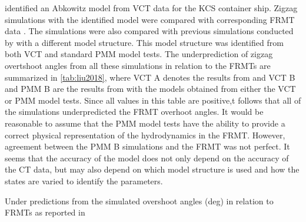 \textcite{liuPredictionsShipManeuverability2018} identified an Abkowitz model from VCT data for the KCS container ship. Zigzag simulations with the identified model were compared with corresponding FRMT data \cite{simmanWorkshopVerificationValidation2014}. The simulations were also compared with previous simulations conducted by  \textcite{simonsenKCSPMMTests2014}  with a different model structure. This model structure was identified from both VCT and standard PMM model tests. The underprediction of zigzag overtshoot angles from all these simulations in relation to the FRMTs are summarized in \autoref{tab:liu2018}, where VCT A denotes the results from \textcite{liuPredictionsShipManeuverability2018} and VCT B and PMM B are the results from \textcite{simonsenKCSPMMTests2014} with the models obtained from either the VCT or PMM model tests.    
Since all values in this table are positive,t follows that all of the simulations underpredicted the FRMT overhoot angles. 
It would be reasonable to assume that the PMM model tests have the ability to provide a correct physical representation of the hydrodynamics in the FRMT. However, agreement between the PMM B simulations and the FRMT was not perfect. It seems that the accuracy of the model does not only depend on the accuracy of the CT data, but may also depend on which model structure is used and how the states are varied to identify the parameters.
\begin{table}[h]
    \centering
    \caption{Under predictions from the simulated overshoot angles (deg) in relation to FRMTs as reported in \textcite{liuPredictionsShipManeuverability2018}}
    \label{tab:liu2018}
\end{table}